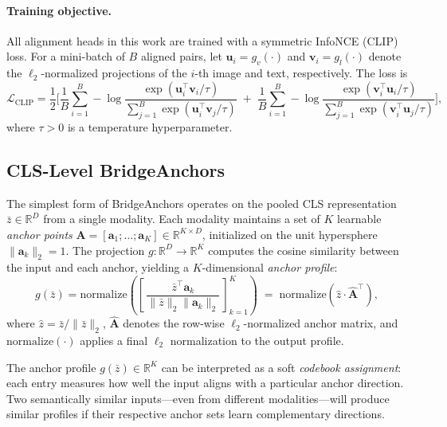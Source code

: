\paragraph{Training objective.}
All alignment heads in this work are trained with a symmetric InfoNCE (CLIP) loss.  For a mini-batch of $B$ aligned pairs, let $\mathbf{u}_i = g_v(\cdot)$ and $\mathbf{v}_i = g_l(\cdot)$ denote the $\ell_2$-normalized projections of the $i$-th image and text, respectively.  The loss is
\begin{equation}
    \mathcal{L}_{\mathrm{CLIP}} = \frac{1}{2}
    \Bigg[
        \frac{1}{B}\sum_{i=1}^{B} -\log \frac{\exp(\mathbf{u}_i^\top \mathbf{v}_i / \tau)}{\sum_{j=1}^{B} \exp(\mathbf{u}_i^\top \mathbf{v}_j / \tau)}
        \;+\;
        \frac{1}{B}\sum_{i=1}^{B} -\log \frac{\exp(\mathbf{v}_i^\top \mathbf{u}_i / \tau)}{\sum_{j=1}^{B} \exp(\mathbf{v}_i^\top \mathbf{u}_j / \tau)}
    \Bigg],
    \label{eq:clip_loss}
\end{equation}
where $\tau > 0$ is a temperature hyperparameter.

\subsection{CLS-Level BridgeAnchors}
\label{sec:cls_ba}

The simplest form of BridgeAnchors operates on the pooled CLS representation $\bar{z} \in \mathbb{R}^D$ from a single modality.  Each modality maintains a set of $K$ learnable \emph{anchor points} $\mathbf{A} = [\mathbf{a}_1; \ldots; \mathbf{a}_K] \in \mathbb{R}^{K \times D}$, initialized on the unit hypersphere $\|\mathbf{a}_k\|_2 = 1$.  The projection $g : \mathbb{R}^D \to \mathbb{R}^K$ computes the cosine similarity between the input and each anchor, yielding a $K$-dimensional \emph{anchor profile}:
\begin{equation}
    g(\bar{z}) = \mathrm{normalize}\!\left(
        \left[\,
            \frac{\bar{z}^\top \mathbf{a}_k}{\|\bar{z}\|_2 \|\mathbf{a}_k\|_2}
        \,\right]_{k=1}^{K}
    \right)
    \;=\; \mathrm{normalize}\!\left(\hat{z} \cdot \hat{\mathbf{A}}^\top\right),
    \label{eq:cls_profile}
\end{equation}
where $\hat{z} = \bar{z} / \|\bar{z}\|_2$, $\hat{\mathbf{A}}$ denotes the row-wise $\ell_2$-normalized anchor matrix, and $\mathrm{normalize}(\cdot)$ applies a final $\ell_2$ normalization to the output profile.

The anchor profile $g(\bar{z}) \in \mathbb{R}^K$ can be interpreted as a soft \emph{codebook assignment}: each entry measures how well the input aligns with a particular anchor direction.  Two semantically similar inputs---even from different modalities---will produce similar profiles if their respective anchor sets learn complementary directions.

